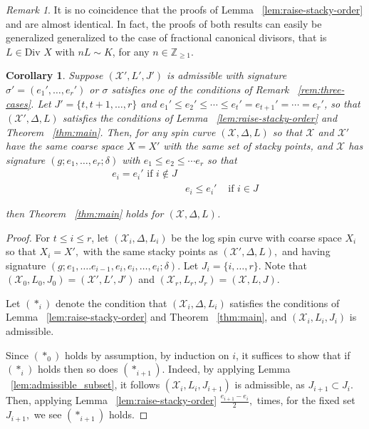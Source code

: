 \documentclass{amsart}
\theoremstyle{plain}
\newtheorem{cor}[thm]{Corollary}
\theoremstyle{definition}
\theoremstyle{remark}
\newtheorem{rem}[thm]{Remark}
\numberwithin{equation}{section}
\newcommand\BZ{{\mathbb Z}}
\newcommand \sx{\mathscr X}
\newcommand \di{\text{Div }}
\newcommand \halfcan{L}
\begin{document}
\begin{rem}
\label{rem:raise-fractional-order}
It is no coincidence that the proofs of Lemma ~\ref{lem:raise-stacky-order} and \cite[Theorem 8.5.7]{vzb:stacky} are almost identical. In fact, the proofs of both results can easily be generalized generalized to the case of fractional canonical divisors, that is $L \in \di X$ with $nL \sim K$, for any $n \in \BZ_{\geq 1}$.
\end{rem}



\begin{cor}
\label{cor:raise-stacky-order}
Suppose $(\sx',L',J')$ is admissible with signature $\sigma' = (e_1',\ldots,e_r')$ or $\sigma$ satisfies one of the conditions of Remark ~\ref{rem:three-cases}. Let $J' = \{t,t+1,\ldots,r\}$ and $e_1' \leq e_2' \leq \cdots \leq e_t' = e_{t+1}' =\cdots = e_r'$,
so that $(\sx',\Delta, L)$ satisfies the conditions of Lemma ~\ref{lem:raise-stacky-order} and Theorem ~\ref{thm:main}. Then, for any spin curve $(\sx,\Delta,L)$ so that $\sx$ and $\sx'$ have the same coarse space $X = X'$ with the same set of stacky points, and $\sx$ has signature $(g;e_1,\ldots, e_r;\delta)$ with $e_1 \leq e_2 \leq \cdots e_r$ so that
\begin{align*}
	e_i	= e_i' \text{ if }i \notin J \\
	& e_i \leq e_i' &\text{ if } i \in J
\end{align*}

\noindent
then Theorem ~\ref{thm:main} holds for $(\sx,\Delta,L)$.
\end{cor}
\begin{proof}
For $t \leq i \leq r$, let $(\sx_i,\Delta, L_i)$ be the log spin curve with coarse space $X_i$ so that $X_i = X',$ with the same stacky points as $(\sx',\Delta,L),$ and having signature $(g; e_1, \ldots. e_{i-1}, e_i, e_i, \ldots, e_i; \delta).$ Let 
$J_i = \{i,\ldots, r\}.$ Note that $(\sx_0,L_0,J_0) = (\sx',L',J')$ and $(\sx_r ,L_r ,J_r) = (\sx, L, J)$.

Let $(*_i)$ denote the condition that $(\sx_i,\Delta, L_i)$ satisfies the conditions of Lemma ~\ref{lem:raise-stacky-order} and Theorem ~\ref{thm:main}, and $(\sx_i, \halfcan_i, J_i)$ is admissible.

Since $(*_0)$ holds by assumption, by induction on $i$, it suffices to show that if $(*_i)$ holds then so does $(*_{i+1}).$ 
Indeed, by applying Lemma ~\ref{lem:admissible_subset}, it follows $(\sx_i, \halfcan_i, J_{i+1})$ is admissible, as $J_{i+1} \subset J_i$. Then, applying Lemma ~\ref{lem:raise-stacky-order} $\frac{e_{i+1}-e_i}{2},$ times, for the fixed set $J_{i+1},$ we see $(*_{i+1})$ holds.
\end{proof}
\end{document}
